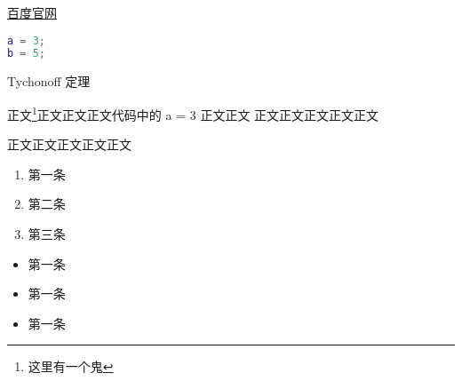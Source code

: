 

\begin{issues}
\issueDraft
\end{issues}

\href{http://www.baidu.com}{百度官网}


\begin{lstlisting}[language=matlab]
a = 3;
b = 5;
\end{lstlisting}

Tychonoff 定理 %

正文\footnote{这里有一个鬼}正文正文正文代码中的 a = 3 正文正文\cite{Cui1}
正文正文正文正文正文

正文正文正文正文正文

\begin{enumerate}
\item 第一条
\item 第二条
\item 第三条
\end{enumerate}

\begin{itemize}
\item 第一条
\item 第一条
\item 第一条
\end{itemize}

